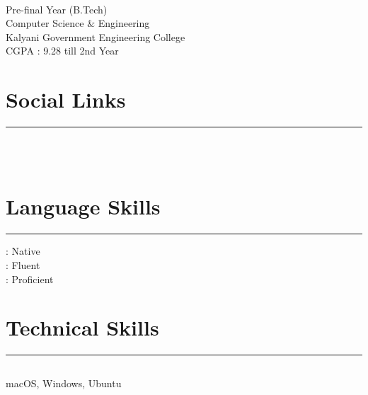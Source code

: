 \documentclass[]{debjitpal-resume}
\begin{document}
%
%

\begin{minipage}[t]{0.35\textwidth}
  \begin{large}
    \\
  \end{large}
  Pre-final Year (B.Tech)\\
  Computer Science $\&$  Engineering\\
  Kalyani Government Engineering College \\
  CGPA : 9.28 till 2nd Year
  \section{Social Links}
  \noindent\rule{5cm}{0.4pt}

  \href{https://github.com/debjitpal5040}{} \href{https://www.linkedin.com/in/debjit-pal-539214192/}{} \href{https://www.twitter.com/debjitpal5040}{} \\
  \href{https://www.codechef.com/users/debjitpal5040}{} \href{https://www.hackerrank.com/debjitpal5040}{} \href{https://codeforces.com/profile/a_beautiful_mind}{} \\
  \href{https://developers.google.com/profile/u/debjitpal}{}
  \section{Language Skills}
  \noindent\rule{5cm}{0.4pt}

   : Native\\
    : Fluent\\
    : Proficient
  \section{Technical Skills}
  \noindent\rule{5cm}{0.4pt}
  \subsection{}
  macOS, Windows, Ubuntu
  \vspace{6pt}

\end{minipage}
\end{document}
